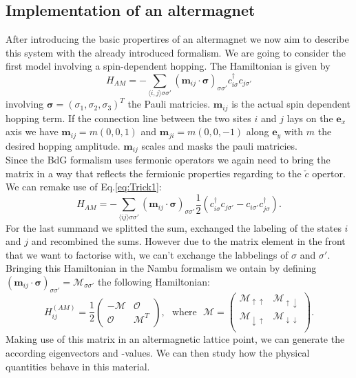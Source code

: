 \documentclass[../main.tex]{main.tex}
\begin{document}
\subsection{Implementation of an altermagnet}
After introducing the basic propertires of an altermagnet we now aim to describe this system with the already introduced formalism.
We are going to consider the first model involving a spin-dependent hopping. The Hamiltonian is given by
\begin{equation*}
    H_{AM} = -\sum_{\langle i, j\rangle\sigma\sigma'} \left(\bm{m}_{ij} \cdot \bm{\sigma}\right)_{\sigma\sigma'} c_{i\sigma}^{\dagger} c_{j\sigma'} 
\end{equation*}
involving $\bm{\sigma}=(\sigma_1, \sigma_2,\sigma_3)^T$ the Pauli matricies. $\bm{m}_{ij}$ is the actual spin dependent hopping term. If the connection line 
between the two sites $i$ and $j$ lays on the $\bm{e}_x$ axis we have $\bm{m}_{ij} = m(0,0,1)$ and $\bm{m}_{ji} = m(0,0,-1)$ along $\bm{e}_y$ with $m$ 
the desired hopping amplitude. $\bm{m}_{ij}$ scales and masks the pauli matricies.\\

Since the BdG formalism uses fermonic operators we again need to bring the matrix in a way that reflects the fermionic properties regarding to the $\check{c}$ opertor.
We can remake use of Eq.\ref{eq:Trick1}:
\begin{equation*}
    H_{AM} = -\sum_{\langle i j\rangle\sigma\sigma'} \left(\bm{m}_{ij} \cdot \bm{\sigma}\right)_{\sigma\sigma'} \frac{1}{2}\left(c_{i\sigma}^{\dagger} c_{j\sigma'} - c_{i\sigma'}c_{j\sigma}^{\dagger}\right).
\end{equation*}
For the last summand we splitted the sum, exchanged the labeling of the states $i$ and $j$ and recombined the sums. However due to the matrix element in the front
that we want to factorise with, we can't exchange the labbelings of $\sigma$ and $\sigma'$.
Bringing this Hamiltonian in the Nambu formalism we ontain by defining
$\left(\bm{m}_{ij} \cdot \bm{\sigma}\right)_{\sigma\sigma'} = \mathcal{M}_{\sigma\sigma'}$ 
the following Hamiltonian:
\begin{equation*}
    H^{(AM)}_{ij} = \frac{1}{2}\begin{pmatrix}
        -\mathcal{M} & \mathcal{O}\\
        \mathcal{O} & \mathcal{M}^T
    \end{pmatrix}
    ,~~~ \text{where} ~~~ \mathcal{M} = \begin{pmatrix}
        \mathcal{M}_{\uparrow\uparrow} & \mathcal{M}_{\uparrow\downarrow}\\
        \mathcal{M}_{\downarrow\uparrow} & \mathcal{M}_{\downarrow\downarrow}\\
    \end{pmatrix}.
\end{equation*}
Making use of this matrix in an altermagnetic lattice point, we can generate the according eigenvectors and -values. We can then study how the physical quantities 
behave in this material.\\
\end{document}
